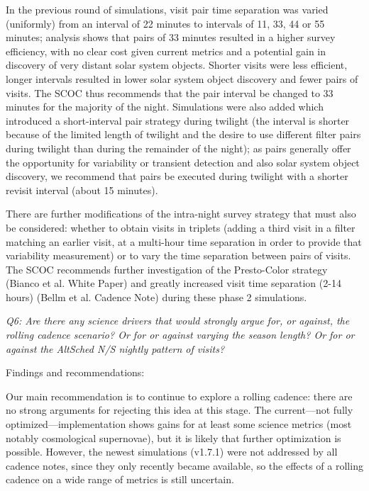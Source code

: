 In the previous round of simulations, visit pair time separation was varied (uniformly) from an interval of 22 minutes to intervals of 11, 33, 44 or 55 minutes; analysis shows that pairs of 33 minutes resulted in a higher survey efficiency, with no clear cost given current metrics and a potential gain in discovery of very distant solar system objects. Shorter visits were less efficient, longer intervals resulted in lower solar system object discovery and fewer pairs of visits. The SCOC thus recommends that the pair interval be changed to 33 minutes for the majority of the night. Simulations were also added which introduced a short-interval pair strategy during twilight (the interval is shorter because of the limited length of twilight and the desire to use different filter pairs during twilight than during the remainder of the night); as pairs generally offer the opportunity for variability or transient detection and also solar system object discovery, we recommend that pairs be executed during twilight with a shorter revisit interval (about 15 minutes). 

There are further modifications of the intra-night survey strategy that must also be considered: whether to obtain visits in triplets (adding a third visit in a filter matching an earlier visit, at a multi-hour time separation in order to provide that variability measurement) or to vary the time separation between pairs of visits. The SCOC recommends further investigation of the Presto-Color strategy (Bianco et al. White Paper) and greatly increased visit time separation (2-14 hours) (Bellm et al. Cadence Note) during these phase 2 simulations. 


{\it Q6:  Are there any science drivers that would strongly argue for, or against, the rolling cadence scenario? Or for or against varying the season length? Or for or against the AltSched N/S nightly pattern of visits? }

Findings and recommendations:

Our main recommendation is to continue to explore a rolling cadence: there are no strong arguments for rejecting this idea at this stage. The current—not fully optimized—implementation shows gains for at least some science metrics (most notably cosmological supernovae), but it is likely that further optimization is possible. However, the newest simulations (v1.7.1) were not addressed by all cadence notes, since they only recently became available, so the effects of a rolling cadence on a wide range of metrics is still uncertain.

